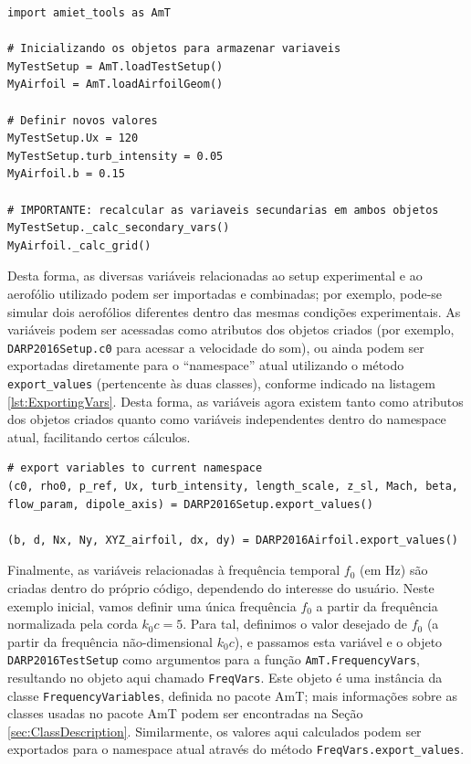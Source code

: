 \documentclass[a4paper, 11pt, twoside]{article}
\begin{document}
\begin{lstlisting}[caption={Método alternativo para carregar variáveis},label={lst:AltLoadingVars}]
import amiet_tools as AmT

# Inicializando os objetos para armazenar variaveis
MyTestSetup = AmT.loadTestSetup()
MyAirfoil = AmT.loadAirfoilGeom()

# Definir novos valores
MyTestSetup.Ux = 120
MyTestSetup.turb_intensity = 0.05
MyAirfoil.b = 0.15

# IMPORTANTE: recalcular as variaveis secundarias em ambos objetos
MyTestSetup._calc_secondary_vars()
MyAirfoil._calc_grid()
\end{lstlisting}

Desta forma, as diversas variáveis relacionadas ao setup experimental e ao aerofólio utilizado podem ser importadas e combinadas; por exemplo, pode-se simular dois aerofólios diferentes dentro das mesmas condições experimentais. As variáveis podem ser acessadas como atributos dos objetos criados (por exemplo, \verb|DARP2016Setup.c0| para acessar a velocidade do som), ou ainda podem ser exportadas diretamente para o ``namespace'' atual utilizando o método \verb|export_values| (pertencente às duas classes), conforme indicado na listagem \ref{lst:ExportingVars}. Desta forma, as variáveis agora existem tanto como atributos dos objetos criados quanto como variáveis independentes dentro do namespace atual, facilitando certos cálculos.

\begin{lstlisting}[caption={Exportando as variáveis},label={lst:ExportingVars}]
# export variables to current namespace
(c0, rho0, p_ref, Ux, turb_intensity, length_scale, z_sl, Mach, beta,
flow_param, dipole_axis) = DARP2016Setup.export_values()

(b, d, Nx, Ny, XYZ_airfoil, dx, dy) = DARP2016Airfoil.export_values()
\end{lstlisting}

Finalmente, as variáveis relacionadas à frequência temporal $f_0$ (em Hz) são criadas dentro do próprio código, dependendo do interesse do usuário. Neste exemplo inicial, vamos definir uma única frequência $f_0$ a partir da frequência normalizada pela corda $k_0 c = 5$. Para tal, definimos o valor desejado de $f_0$ (a partir da frequência não-dimensional $k_0 c$), e passamos esta variável e o objeto \verb|DARP2016TestSetup| como argumentos para a função \verb|AmT.FrequencyVars|, resultando no objeto aqui chamado \verb|FreqVars|. Este objeto é uma instância da classe \verb|FrequencyVariables|, definida no pacote AmT; mais informações sobre as classes usadas no pacote AmT podem ser encontradas na Seção \ref{sec:ClassDescription}. Similarmente, os valores aqui calculados podem ser exportados para o namespace atual através do método \verb|FreqVars.export_values|.
\end{document}
